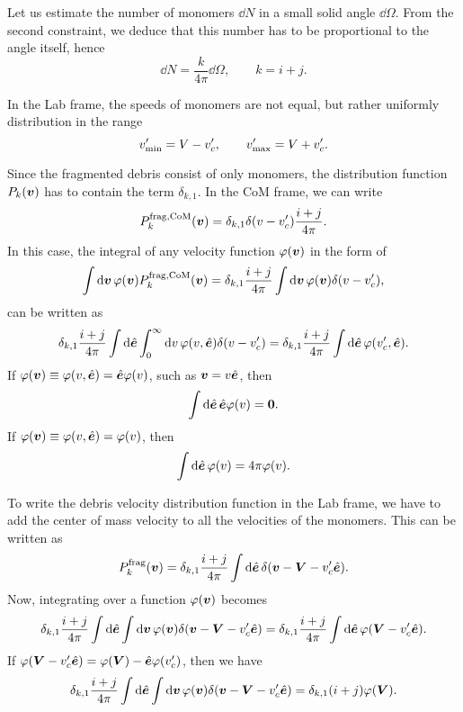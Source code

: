 \documentclass[aps,prl,preprint,groupedaddress,10pt]{revtex4-2}
\begin{document}
Let us estimate the number of monomers $\dd{N}$ in a small solid angle $\dd{\Omega}$.
From the second constraint, we deduce that this number has to be proportional to the 
angle itself, hence 
\begin{equation}
    \dd{N}=\frac{k}{4\pi}\dd{\Omega},\qquad k=i+j.
\end{equation}

In the Lab frame, the speeds of monomers are not equal, but rather uniformly 
distribution in the range 
\begin{equation}
    v'_{\mathrm{min}}=V-v'_c,\qquad v'_{\mathrm{max}}=V+v'_c.
\end{equation}

Since the fragmented debris consist of only monomers, the distribution function 
$P_k\pqty{\bv}$ has to contain the term $\delta_{k,1}$. In the CoM frame, we can write 
\begin{equation}
    \utx{P_k}{frag, CoM}\pqty{\bv}=\delta_{k,1}\delta\pqty{v-v'_c}\frac{i+j}{4\pi}.
\end{equation}
In this case, the integral of any velocity function $\varphi\pqty{\bv}$ in the form of 
\begin{equation}
    \int\dd{\bv}\varphi\pqty{\bv}\utx{P_k}{frag,CoM}\pqty{\bv}=
    \delta_{k,1}\frac{i+j}{4\pi}\int\dd{\bv}\varphi\pqty{\bv}\delta\pqty{v-v'_c},
\end{equation}
can be written as 
\begin{equation}
    \delta_{k,1}\frac{i+j}{4\pi}\int\dd{\be}
    \int_{0}^{\infty}\dd{v}\varphi\pqty{v,\be}\delta\pqty{v-v'_c}=
    \delta_{k,1}\frac{i+j}{4\pi}\int\dd{\be}\varphi\pqty{v'_c,\be}.
\end{equation}
If $\varphi\pqty{\bv}\equiv\varphi\pqty{v,\be}=\be\varphi\pqty{v}$, such as $\vb*{v}=v\hat{\vb*{e}}$, 
then 
\begin{equation}
    \int\dd{\be}\be\varphi\pqty{v}=\bnull.
\end{equation}
If $\varphi\pqty{\bv}\equiv\varphi\pqty{v,\be}=\varphi\pqty{v}$, then 
\begin{equation}
    \int\dd{\be}\varphi\pqty{v}=4\pi\varphi\pqty{v}.
\end{equation}

To write the debris velocity distribution function in the Lab frame, we have to 
add the center of mass velocity to all the velocities of the monomers. This can be 
written as 
\begin{equation}
    \utx{P_k}{frag}\pqty{\bv}=
    \delta_{k,1}\frac{i+j}{4\pi}\int\dd{\be}\delta\pqty{\bv-\bV-v'_c\be}.
\end{equation}
Now, integrating over a function $\varphi\pqty{\bv}$ becomes
\begin{equation}
    \delta_{k,1}\frac{i+j}{4\pi}\int\dd{\be}\int\dd{\bv}\varphi\pqty{\bv}
    \delta\pqty{\bv-\bV-v'_c\be}=
    \delta_{k,1}\frac{i+j}{4\pi}\int\dd{\be}\varphi\pqty{\bV-v'_c\be}.
\end{equation}
If $\varphi\pqty{\bV-v'_c\be}=\varphi\pqty{\bV}-\be\varphi\pqty{v'_c}$, then 
we have
\begin{equation}
    \delta_{k,1}\frac{i+j}{4\pi}\int\dd{\be}\int\dd{\bv}\varphi\pqty{\bv}
    \delta\pqty{\bv-\bV-v'_c\be}=\delta_{k,1}\pqty{i+j}\varphi\pqty{\bV}.
\end{equation}
\end{document}

